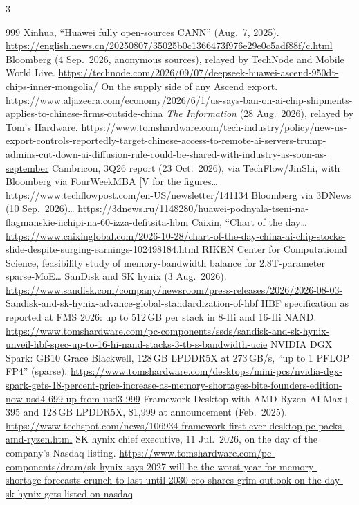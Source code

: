 \begin{multicols}{3}
\begin{thebibliography}{999}
 Xinhua, ``Huawei fully open-sources CANN'' (Aug.\ 7, 2025). \url{https://english.news.cn/20250807/35025b0c1366473f976e29e0c5adf88f/c.html}
 Bloomberg (4 Sep.\ 2026, anonymous sources), relayed by TechNode and Mobile World Live. \url{https://technode.com/2026/09/07/deepseek-huawei-ascend-950dt-chips-inner-mongolia/}
 On the supply side of any Ascend export. \url{https://www.aljazeera.com/economy/2026/6/1/us-says-ban-on-ai-chip-shipments-applies-to-chinese-firms-outside-china}
 \emph{The Information} (28 Aug.\ 2026), relayed by Tom's Hardware. \url{https://www.tomshardware.com/tech-industry/policy/new-us-export-controls-reportedly-target-chinese-access-to-remote-ai-servers-trump-admins-cut-down-ai-diffusion-rule-could-be-shared-with-industry-as-soon-as-september}
 Cambricon, 3Q26 report (23 Oct.\ 2026), via TechFlow/JinShi, with Bloomberg via FourWeekMBA [V for the figures… \url{https://www.techflowpost.com/en-US/newsletter/141134}
 Bloomberg via 3DNews (10 Sep.\ 2026)… \url{https://3dnews.ru/1148280/huawei-podnyala-tseni-na-flagmanskie-iichipi-na-60-izza-defitsita-hbm}
 Caixin, ``Chart of the day… \url{https://www.caixinglobal.com/2026-10-28/chart-of-the-day-china-ai-chip-stocks-slide-despite-surging-earnings-102498184.html}
 RIKEN Center for Computational Science, feasibility study of memory-bandwidth balance for 2.8T-parameter sparse-MoE…
 SanDisk and SK hynix (3 Aug.\ 2026). \url{https://www.sandisk.com/company/newsroom/press-releases/2026/2026-08-03-Sandisk-and-sk-hynix-advance-global-standardization-of-hbf}
 HBF specification as reported at FMS 2026: up to 512\,GB per stack in 8-Hi and 16-Hi NAND. \url{https://www.tomshardware.com/pc-components/ssds/sandisk-and-sk-hynix-unveil-hbf-spec-up-to-16-hi-nand-stacks-3-tb-s-bandwidth-ucie}
 NVIDIA DGX Spark: GB10 Grace Blackwell, 128\,GB LPDDR5X at 273\,GB/s, ``up to 1 PFLOP FP4'' (sparse). \url{https://www.tomshardware.com/desktops/mini-pcs/nvidia-dgx-spark-gets-18-percent-price-increase-as-memory-shortages-bite-founders-edition-now-usd4-699-up-from-usd3-999}
 Framework Desktop with AMD Ryzen AI Max+ 395 and 128\,GB LPDDR5X, \$1,999 at announcement (Feb.\ 2025). \url{https://www.techspot.com/news/106934-framework-first-ever-desktop-pc-packs-amd-ryzen.html}
 SK hynix chief executive, 11 Jul.\ 2026, on the day of the company's Nasdaq listing. \url{https://www.tomshardware.com/pc-components/dram/sk-hynix-says-2027-will-be-the-worst-year-for-memory-shortage-forecasts-crunch-to-last-until-2030-ceo-shares-grim-outlook-on-the-day-sk-hynix-gets-listed-on-nasdaq}

\end{thebibliography}
\end{multicols}
